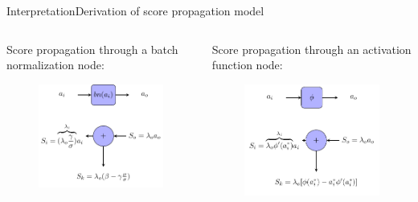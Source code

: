 \documentclass{beamer}
\begin{document}
\begin{frame}{Interpretation}{Derivation of score propagation model}
\begin{columns}
	\begin{column}{0.5\textwidth}
		\alert{Score propagation through a batch normalization node:}
		\begin{figure}
			\centering
			\includegraphics{./chapter_interpretation/score_bn.pdf}
		\end{figure}		
	\end{column}

	\begin{column}{0.5\textwidth}
		\alert{Score propagation through an activation function node:}
		\begin{figure}
			\centering
			\includegraphics[width=\textwidth]{./chapter_interpretation/score_af.pdf}
		\end{figure}
	\end{column}
\end{columns}
\end{frame}
\end{document}

